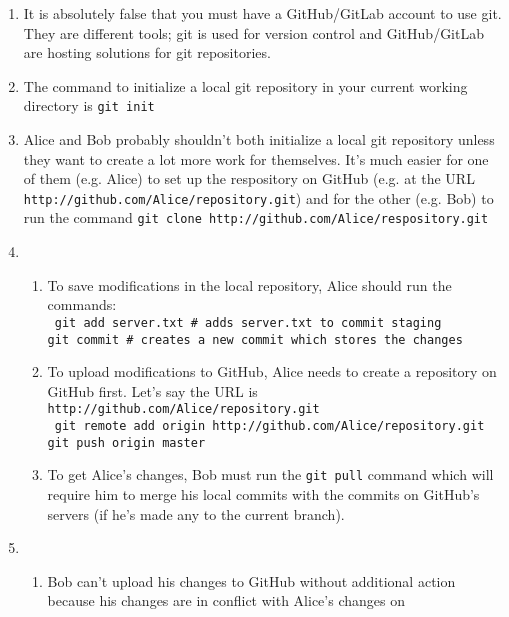 \documentclass{report}
\begin{document}
\begin{problem}
\begin{answer}{37em}
  \begin{enumerate}
  \item It is absolutely false that you must have a GitHub/GitLab account to
        use git. They are different tools; git is used for version control and
        GitHub/GitLab are hosting solutions for git repositories.
  \item The command to initialize a local git repository in your current
        working directory is \texttt{git init}
  \item Alice and Bob probably shouldn't both initialize a local git
        repository unless they want to create a lot more work for themselves.
        It's much easier for one of them (e.g. Alice) to set up the
        respository on GitHub (e.g. at the URL
        \texttt{http://github.com/Alice/repository.git}) and for the other
        (e.g. Bob) to run the command
        \texttt{git clone http://github.com/Alice/respository.git}
  \item
    \begin{enumerate}
    \item To save modifications in the local repository, Alice should run the
          commands:\\
          \texttt{
            git add server.txt \# adds server.txt to commit staging\\
            git commit \# creates a new commit which stores the changes
          }
    \item To upload modifications to GitHub, Alice needs to create a
          repository on GitHub first. Let's say the URL is
          \texttt{http://github.com/Alice/repository.git}\\
          \texttt{
            git remote add origin http://github.com/Alice/repository.git\\
            git push origin master
          }
    \item To get Alice's changes, Bob must run the \texttt{git pull} command
          which will require him to merge his local commits with the commits
          on GitHub's servers (if he's made any to the current branch).
    \end{enumerate}
  \item
    \begin{enumerate}
      \item Bob can't upload his changes to GitHub without additional action
            because his changes are in conflict with Alice's changes on

\end{enumerate}
\end{enumerate}
\end{answer}
\end{problem}
\end{document}
